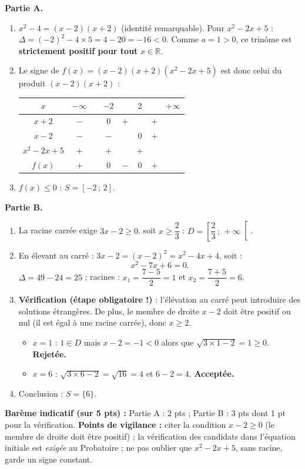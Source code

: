 \documentclass[11pt]{article}
\begin{document}
\begin{corrige}
\textbf{Partie A.}
\begin{enumerate}
    \item $x^2 - 4 = (x-2)(x+2)$ (identité remarquable). Pour $x^2 - 2x + 5$ : $\Delta = (-2)^2 - 4 \times 5 = 4 - 20 = -16 < 0$. Comme $a = 1 > 0$, ce trinôme est \textbf{strictement positif pour tout} $x \in \mathbb{R}$.
    \item Le signe de $f(x) = (x-2)(x+2)(x^2-2x+5)$ est donc celui du produit $(x-2)(x+2)$ :
    \begin{center}
    \begin{tabular}{|c|ccccccc|}\hline
    $x$ & $-\infty$ & & $-2$ & & $2$ & & $+\infty$ \\ \hline
    $x+2$ & $-$ & & $0$ & $+$ & & $+$ & \\ \hline
    $x-2$ & $-$ & & $-$ & & $0$ & $+$ & \\ \hline
    $x^2-2x+5$ & $+$ & & $+$ & & $+$ & & \\ \hline
    $f(x)$ & $+$ & & $0$ & $-$ & $0$ & $+$ & \\ \hline
    \end{tabular}
    \end{center}
    \item $f(x) \le 0$ : $S = [-2\,;\,2]$.
\end{enumerate}
\textbf{Partie B.}
\begin{enumerate}
    \item La racine carrée exige $3x - 2 \ge 0$, soit $x \ge \dfrac{2}{3}$ : $D = \left[\dfrac{2}{3}\,;\,+\infty\right[$.
    \item En élevant au carré : $3x - 2 = (x-2)^2 = x^2 - 4x + 4$, soit :
    \[ x^2 - 7x + 6 = 0. \]
    $\Delta = 49 - 24 = 25$ ; racines : $x_1 = \dfrac{7-5}{2} = 1$ et $x_2 = \dfrac{7+5}{2} = 6$.
    \item \textbf{Vérification (étape obligatoire !)} : l'élévation au carré peut introduire des solutions étrangères. De plus, le membre de droite $x - 2$ doit être positif ou nul (il est égal à une racine carrée), donc $x \ge 2$.
    \begin{itemize}
        \item $x = 1$ : $1 \in D$ mais $x - 2 = -1 < 0$ alors que $\sqrt{3 \times 1 - 2} = 1 \ge 0$. \textbf{Rejetée.}
        \item $x = 6$ : $\sqrt{3 \times 6 - 2} = \sqrt{16} = 4$ et $6 - 2 = 4$. \textbf{Acceptée.}
    \end{itemize}
    \item Conclusion : $S = \{6\}$.
\end{enumerate}
\textbf{Barème indicatif (sur 5 pts) :} Partie A : 2 pts ; Partie B : 3 pts dont 1 pt pour la vérification.
\textbf{Points de vigilance :} citer la condition $x - 2 \ge 0$ (le membre de droite doit être positif) ; la vérification des candidats dans l'équation initiale est \emph{exigée} au Probatoire ; ne pas oublier que $x^2 - 2x + 5$, sans racine, garde un signe constant.
\end{corrige}
\end{document}
